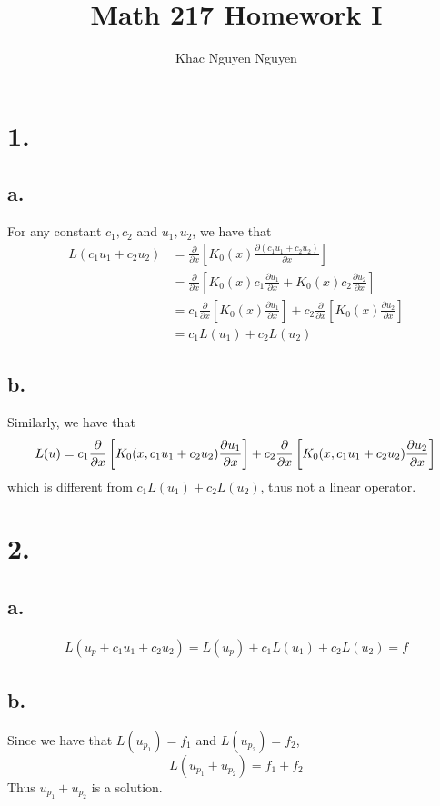 \documentclass[11pt]{article}
\title{\textbf{Math 217 Homework I}}
\author{Khac Nguyen Nguyen}
\date{}
\theoremstyle{mystyle}
\theoremstyle{definition}
\begin{document}
\section*{1.}
\subsection*{a.}
For any constant $c_1, c_2$ and $u_1, u_2$, we have that 
\begin{align*}
  L(c_1u_1 + c_2 u_2) &= \displaystyle\frac{\partial }{\partial x} \left[K_0(x) \displaystyle\frac{\partial (c_1u_1 + c_2 u_2)}{\partial x}\right] \\
  &= \displaystyle\frac{\partial }{\partial x}\left[K_0(x) c_1 \displaystyle\frac{\partial u_1}{\partial x} + K_0(x) c_2 \displaystyle\frac{\partial u_2}{\partial x}\right] \\
  &= c_1\displaystyle\frac{\partial }{\partial x}\left[K_0(x)  \displaystyle\frac{\partial u_1}{\partial x} \right] + c_2 \displaystyle\frac{\partial }{\partial x} \left[K_0(x) \displaystyle\frac{\partial u_2}{\partial x}\right] \\ 
  &= c_1 L(u_1) + c_2L(u_2)
\end{align*}
\subsection*{b.}
Similarly, we have that 
\[
  L(u) = c_1\displaystyle\frac{\partial }{\partial x}\left[K_0(x, c_1u_1 + c_2u_2)  \displaystyle\frac{\partial u_1}{\partial x} \right] + c_2 \displaystyle\frac{\partial }{\partial x} \left[K_0(x, c_1 u_1 + c_2u_2) \displaystyle\frac{\partial u_2}{\partial x}\right] \\ 
\]
which is different from $c_1L(u_1) + c_2 L(u_2)$, thus not a linear operator. 
\newpage
\section*{2.}
\subsection*{a.}
\begin{align*}
  L(u_p + c_1 u_1 + c_2 u_2) = L(u_p) + c_1L(u_1) + c_2L(u_2) = f
\end{align*}
\subsection*{b.}
Since we have that $L(u_{p_1}) = f_1$ and $L(u_{p_2}) = f_2$,
\[
  L(u_{p_1} + u_{p_2}) = f_1 + f_2
\]
Thus $u_{p_1} + u_{p_2}$ is a solution. 
\newpage
\end{document}
